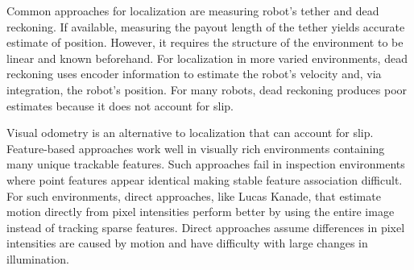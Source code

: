 \documentclass[letterpaper, 10 pt, conference]{ieeeconf}
\begin{document}
Common approaches for localization are measuring robot's tether and dead reckoning. If available, measuring the payout length of the tether yields accurate estimate of position. However, it requires the structure of the environment to be linear and known beforehand. For localization in more varied environments, dead reckoning uses encoder information to estimate the robot's velocity and, via integration, the robot's position. For many robots, dead reckoning produces poor estimates because it does not account for slip.


Visual odometry is an alternative to localization that can account for slip. Feature-based approaches work well in visually rich environments containing many unique trackable features. Such approaches fail in inspection environments where point features appear identical making stable feature association difficult. For such environments, direct approaches, like Lucas Kanade, that estimate motion directly from pixel intensities perform better by using the entire image instead of tracking sparse features. Direct approaches assume differences in pixel intensities are caused by motion and have difficulty with large changes in illumination.
\end{document}
